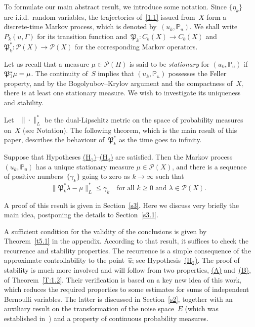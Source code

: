 \documentclass[JEP,XML,SOM,Unicode,ThmDefs]{cedram}
\let\mathcal\mathscr
\theoremstyle{plain}
\numberwithin{equation}{section}
\newcommand{\IP}{{\mathbb P}}
\newcommand{\PP}{{\mathcal P}}
\newcommand{\PPPP}{{\mathfrak P}}
\begin{document}
To formulate our main abstract result, we introduce some notation. Since $\{\eta_k\}$ are i.i.d.\ random variables, the trajectories of~\eqref{1.1} issued from~$X$ form a discrete-time Markov process, which is denoted by~$(u_k,\IP_u)$. We shall write $P_k(u,\Gamma)$ for its transition function and~$\PPPP_k:C_b(X)\to C_b(X)$ and $\PPPP_k^*:\PP(X)\to\PP(X)$ for the corresponding Markov operators.

Let us recall that a measure $\mu \in \PP(H)$ is said to be \emph{stationary} for $(u_k,\IP_u)$ if~$\PPPP^*_1\mu=\nobreak\mu$. The continuity of~$S$ implies that $(u_k,\IP_u)$ possesses the Feller property, and by the Bogolyubov--Krylov argument and the compactness of~$X$, there is at least one stationary measure. We wish to investigate its uniqueness and stability.

Let ~$\|\cdot\|_L^*$ be the dual-Lipschitz metric on the space of probability measures on~$X$ (see Notation). The following theorem, which is the main result of this paper, describes the behaviour of~$\PPPP_k^*$ as the time goes to infinity.

\begin{theorem} \label{t1.1}
Suppose that Hypotheses \hyperlink{H1}{\rm(H$_1$)}--\hyperlink{H4}{\rm(H$_4$)} are satisfied. Then the Markov process $(u_k,\IP_u)$ has a unique stationary measure $\mu\in \PP(X)$, and there is a sequence of positive numbers~$\{\gamma_k\}$ going to zero as $k\to\infty$ such that
\begin{equation} \label{1.6}
\|\PPPP_k^*\lambda-\mu\|_L^*\le \gamma_k\quad\text{for all $k\ge0$ and $\lambda\in\PP(X)$}.
\end{equation}
\end{theorem}
A proof of this result is given in Section~\ref{s3}. Here we discuss very briefly the main idea, postponing the details to Section~\ref{s3.1}.

A sufficient condition for the validity of the conclusions is given by Theorem~\ref{t5.1} in the appendix. According to that result, it suffices to check the recurrence and stability properties. The recurrence is a simple consequence of the approximate controllability to the point~$\hat u$; see Hypothesis~\hyperlink{H2}{(H$_2$)}. The proof of stability is much more involved and will follow from two properties, \hyperlink{(A)}{(A)} and~\hyperlink{(B)}{(B)}, of Theorem~\ref{T:1.2}. Their verification is based on a key new idea of this work, which reduces the required properties to some estimates for sums of independent Bernoulli variables. The latter is discussed in Section~\ref{s2}, together with an auxiliary result on the transformation of the noise space~$E$ (which was established in~\cite{KNS-2020}) and a property of continuous probability measures.
\end{document}
